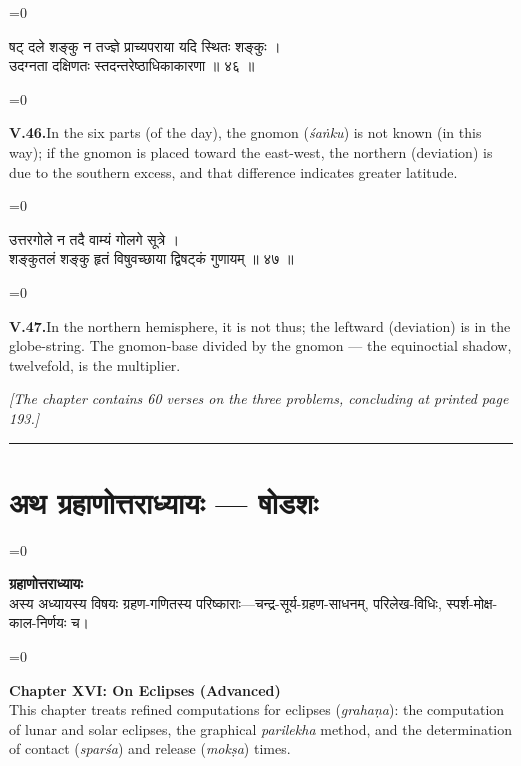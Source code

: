 \documentclass[11pt,a4paper]{article}
\newcommand{\longline}{\noindent\rule{\textwidth}{0.4pt}}
\newcommand{\cnote}[1]{\textcolor{notecolor}{\textit{#1}}}
\newcommand{\dev}[1]{{\devanagarifont\color{sktcolor}#1}}
\newcommand{\dsec}[1]{\section*{\dev{#1}}}
\newcommand{\iast}[1]{\textit{#1}}
\newenvironment{paracol}[1]{\begingroup}{\endgroup}
\newcommand{\switchcolumn}[1][]{%
  \ifnum#1=0\relax\else\par\nobreak\vspace{0.5em}\par\nobreak\fi%
}
\begin{document}
\vspace{0.3cm}

\begin{paracol}{2}
\switchcolumn[0]
\dev{%
षट् दले शङ्कु न तज्ज्ञे प्राच्यपराया यदि स्थितः शङ्कुः ।\\
उदग्नता दक्षिणतः स्तदन्तरेष्ठाधिकाकारणा ॥ ४६ ॥
}

\switchcolumn[1]
\textbf{V.46.}\quad In the six parts (of the day), the gnomon
(\iast{śaṅku}) is not known (in this way); if the gnomon is placed
toward the east-west, the northern (deviation) is due to the
southern excess, and that difference indicates greater latitude.
\end{paracol}

\vspace{0.3cm}

\begin{paracol}{2}
\switchcolumn[0]
\dev{%
उत्तरगोले न तदै वाम्यं गोलगे सूत्रे ।\\
शङ्कुतलं शङ्कु हृतं विषुवच्छाया द्विषट्कं गुणायम् ॥ ४७ ॥
}

\switchcolumn[1]
\textbf{V.47.}\quad In the northern hemisphere, it is not thus; the
leftward (deviation) is in the globe-string. The gnomon-base divided
by the gnomon — the equinoctial shadow, twelvefold, is the multiplier.
\end{paracol}

\vspace{0.3cm}
\cnote{[The chapter contains 60 verses on the three problems,
concluding at printed page 193.]}

\longline
\newpage

\dsec{अथ ग्रहाणोत्तराध्यायः — षोडशः}

\begin{paracol}{2}
\switchcolumn[0]
\dev{%
\textbf{ग्रहाणोत्तराध्यायः}\\[0.2cm]
अस्य अध्यायस्य विषयः ग्रहण-गणितस्य परिष्काराः—चन्द्र-सूर्य-ग्रहण-साधनम्,
परिलेख-विधिः, स्पर्श-मोक्ष-काल-निर्णयः च।
}

\switchcolumn[1]
\textbf{Chapter XVI: On Eclipses (Advanced)}\\[0.2cm]
This chapter treats refined computations for eclipses
(\iast{grahaṇa}): the computation of lunar and solar eclipses,
the graphical \iast{parilekha} method, and the determination of
contact (\iast{sparśa}) and release (\iast{mokṣa}) times.
\end{paracol}
\end{document}
